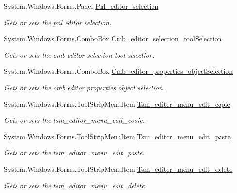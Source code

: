 \begin{DoxyCompactItemize}
System.\-Windows.\-Forms.\-Panel \hyperlink{class_a_rdev_kit_1_1_editor_window_a601e295ca226828c6ca4eadc21101a78}{Pnl\-\_\-editor\-\_\-selection}
\begin{DoxyCompactList}\small\item\em Gets or sets the pnl editor selection. \end{DoxyCompactList}\item 
System.\-Windows.\-Forms.\-Combo\-Box \hyperlink{class_a_rdev_kit_1_1_editor_window_a0937e4db376a67530e488c174d512925}{Cmb\-\_\-editor\-\_\-selection\-\_\-tool\-Selection}
\begin{DoxyCompactList}\small\item\em Gets or sets the cmb editor selection tool selection. \end{DoxyCompactList}\item 
System.\-Windows.\-Forms.\-Combo\-Box \hyperlink{class_a_rdev_kit_1_1_editor_window_a7a5f59a2277ea660f5ac354ed6563931}{Cmb\-\_\-editor\-\_\-properties\-\_\-object\-Selection}
\begin{DoxyCompactList}\small\item\em Gets or sets the cmb editor properties object selection. \end{DoxyCompactList}\item 
System.\-Windows.\-Forms.\-Tool\-Strip\-Menu\-Item \hyperlink{class_a_rdev_kit_1_1_editor_window_a7ce809e15aaf06e0d514989fb6292687}{Tsm\-\_\-editor\-\_\-menu\-\_\-edit\-\_\-copie}
\begin{DoxyCompactList}\small\item\em Gets or sets the tsm\-\_\-editor\-\_\-menu\-\_\-edit\-\_\-copie. \end{DoxyCompactList}\item 
System.\-Windows.\-Forms.\-Tool\-Strip\-Menu\-Item \hyperlink{class_a_rdev_kit_1_1_editor_window_ac2310f24fffc1c84b2c23c5e6cbd8156}{Tsm\-\_\-editor\-\_\-menu\-\_\-edit\-\_\-paste}
\begin{DoxyCompactList}\small\item\em Gets or sets the tsm\-\_\-editor\-\_\-menu\-\_\-edit\-\_\-paste. \end{DoxyCompactList}\item 
System.\-Windows.\-Forms.\-Tool\-Strip\-Menu\-Item \hyperlink{class_a_rdev_kit_1_1_editor_window_a94b80b86878dae463d966bd117732260}{Tsm\-\_\-editor\-\_\-menu\-\_\-edit\-\_\-delete}
\begin{DoxyCompactList}\small\item\em Gets or sets the tsm\-\_\-editor\-\_\-menu\-\_\-edit\-\_\-delete. \end{DoxyCompactList}\end{DoxyCompactItemize}


